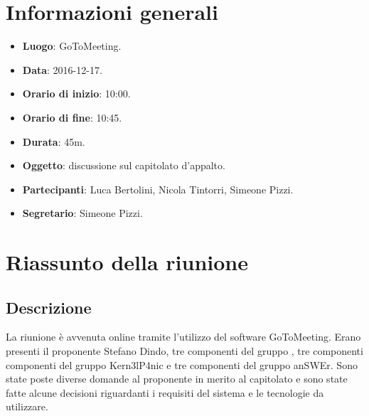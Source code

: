 \documentclass[a4paper,titlepage]{article}
\begin{document}
\maketitle
\begin{diario}
\end{diario}
\newpage
\tableofcontents

\newpage
\section{Informazioni generali}
\label{sec:Informazioni}

\begin{itemize}
  \item \textbf{Luogo}: GoToMeeting.
  \item \textbf{Data}: 2016-12-17.
  \item \textbf{Orario di inizio}: 10:00.
  \item \textbf{Orario di fine}: 10:45.
  \item \textbf{Durata}: 45m.
  \item \textbf{Oggetto}: discussione sul capitolato d'appalto.
  \item \textbf{Partecipanti}: Luca Bertolini, Nicola Tintorri, Simeone Pizzi.
  \item \textbf{Segretario}: Simeone Pizzi.
  
\end{itemize}
\section{Riassunto della riunione}
\label{sec:RiassuntoRiunione}
 \subsection{Descrizione}
La riunione è avvenuta online tramite l'utilizzo del software GoToMeeting. Erano presenti il proponente Stefano Dindo, tre componenti del gruppo \GRUPPO{}, tre componenti componenti del gruppo Kern3lP4nic e tre componenti del gruppo anSWEr. Sono state poste diverse domande al proponente in merito al capitolato  \CAPITOLATO e sono state fatte alcune decisioni riguardanti i requisiti del sistema e le tecnologie da utilizzare.
\end{document}
